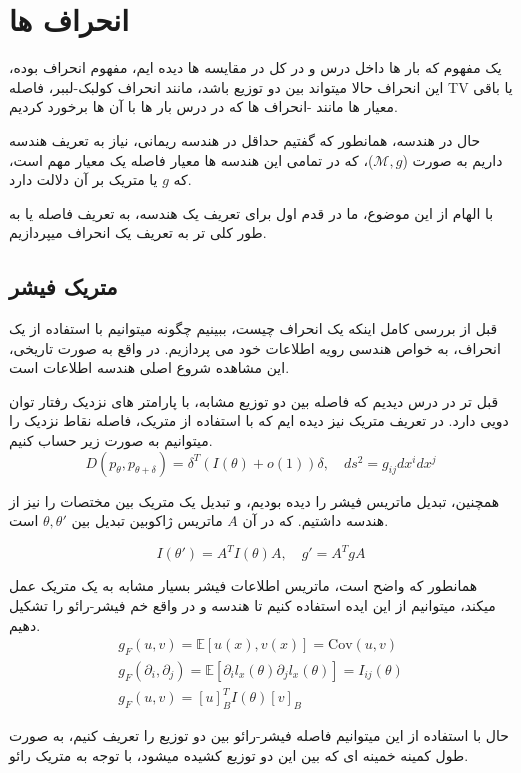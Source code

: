 \section{انحراف‌ ها}
 
یک مفهوم که بار ها داخل درس و در کل در مقایسه ها دیده ایم، مفهوم انحراف بوده، این انحراف
حالا میتواند بین دو توزیع باشد، مانند انحراف کولبک-لببر، فاصله TV یا باقی معیار ها مانند -انحراف ها که در درس بار ها با آن ها برخورد کردیم.

حال در هندسه، همانطور که گفتیم حداقل در هندسه ریمانی، نیاز به تعریف هندسه داریم به صورت ($\mathcal{M}, g$)، که در تمامی این هندسه ها معیار فاصله یک معیار مهم است، که $g$ یا متریک بر آن دلالت دارد.

با الهام از این موضوع، ما در قدم اول برای تعریف یک هندسه، به تعریف فاصله یا به طور کلی تر به تعریف یک انحراف میپردازیم.

\subsection{متریک فیشر}

قبل از بررسی کامل اینکه یک انحراف چیست، ببینیم چگونه میتوانیم با استفاده از یک انحراف، به خواص هندسی رویه اطلاعات خود می پردازیم. در واقع به صورت تاریخی، این مشاهده شروع اصلی هندسه اطلاعات است.

قبل تر در درس دیدیم که فاصله بین دو توزیع مشابه، با پارامتر های نزدیک رفتار توان دویی دارد. در تعریف متریک نیز دیده ایم که با استفاده از متریک، فاصله نقاط نزدیک را میتوانیم به صورت زیر حساب کنیم. 
$$D(p_\theta, p_{\theta+\delta})=\delta^T(I(\theta)+o(1))\delta, \quad ds^2=g_{ij}dx^idx^j$$

همچنین، تبدیل ماتریس فیشر را دیده بودیم، و تبدیل یک متریک بین مختصات را نیز از هندسه داشتیم. که در آن $A$ ماتریس ژاکوبین تبدیل بین $\theta, \theta'$ است.

$$I(\theta')=A^TI(\theta)A, \quad g'=A^TgA$$

همانطور که واضح است، ماتریس اطلاعات فیشر بسیار مشابه به یک متریک عمل میکند، میتوانیم از این ایده استفاده کنیم تا هندسه و در واقع خم فیشر-رائو را تشکیل دهیم.
\begin{align*}
    g_F(u,v)=\mathbb{E}[u(x), v(x)]=\text{Cov}(u, v)\\
    g_F(\partial_i, \partial_j)=\mathbb{E}[\partial_il_x(\theta)\partial_jl_x(\theta)]=I_{ij}(\theta)\\
    g_F(u,v)=[u]_B^TI(\theta)[v]_B
\end{align*}

حال با استفاده از این میتوانیم فاصله فیشر-رائو بین دو توزیع را تعریف کنیم، به صورت طول کمینه خمینه ای که بین این دو توزیع کشیده میشود، با توجه به متریک رائو.

